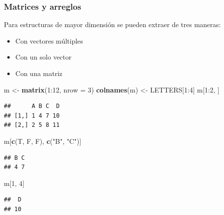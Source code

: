 \documentclass[]{article}
\newenvironment{Shaded}{\begin{snugshade}}{\end{snugshade}}
\newcommand{\KeywordTok}[1]{\textcolor[rgb]{0.13,0.29,0.53}{\textbf{{#1}}}}
\newcommand{\DataTypeTok}[1]{\textcolor[rgb]{0.13,0.29,0.53}{{#1}}}
\newcommand{\DecValTok}[1]{\textcolor[rgb]{0.00,0.00,0.81}{{#1}}}
\newcommand{\StringTok}[1]{\textcolor[rgb]{0.31,0.60,0.02}{{#1}}}
\newcommand{\NormalTok}[1]{{#1}}
\begin{document}
\subsubsection{Matrices y arreglos}\label{matrices-y-arreglos}

Para estructuras de mayor dimensión se pueden extraer de tres maneras:

\begin{itemize}
\itemsep1pt\parskip0pt
\item
  Con vectores múltiples
\item
  Con un solo vector
\item
  Con una matriz
\end{itemize}

\begin{Shaded}
\begin{Highlighting}[]
\NormalTok{m <-}\StringTok{ }\KeywordTok{matrix}\NormalTok{(}\DecValTok{1}\NormalTok{:}\DecValTok{12}\NormalTok{, }\DataTypeTok{nrow =} \DecValTok{3}\NormalTok{)}
\KeywordTok{colnames}\NormalTok{(m) <-}\StringTok{ }\NormalTok{LETTERS[}\DecValTok{1}\NormalTok{:}\DecValTok{4}\NormalTok{]}
\NormalTok{m[}\DecValTok{1}\NormalTok{:}\DecValTok{2}\NormalTok{, ]}
\end{Highlighting}
\end{Shaded}

\begin{verbatim}
##      A B C  D
## [1,] 1 4 7 10
## [2,] 2 5 8 11
\end{verbatim}

\begin{Shaded}
\begin{Highlighting}[]
\NormalTok{m[}\KeywordTok{c}\NormalTok{(T, F, F), }\KeywordTok{c}\NormalTok{(}\StringTok{"B"}\NormalTok{, }\StringTok{"C"}\NormalTok{)]}
\end{Highlighting}
\end{Shaded}

\begin{verbatim}
## B C 
## 4 7
\end{verbatim}

\begin{Shaded}
\begin{Highlighting}[]
\NormalTok{m[}\DecValTok{1}\NormalTok{, }\DecValTok{4}\NormalTok{]}
\end{Highlighting}
\end{Shaded}

\begin{verbatim}
##  D 
## 10
\end{verbatim}
\end{document}
